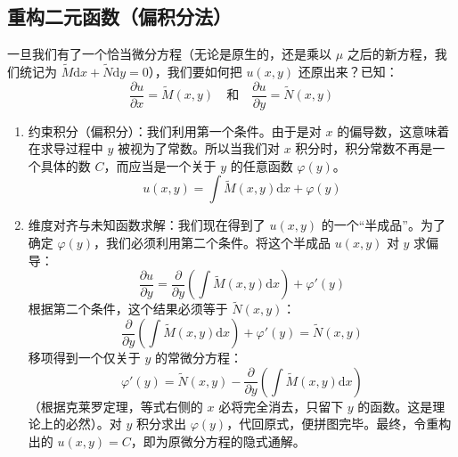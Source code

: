 \documentclass[lang=cn,11pt]{elegantbook}
\begin{document}
\subsection{重构二元函数（偏积分法）}

一旦我们有了一个恰当微分方程（无论是原生的，还是乘以 $\mu$ 之后的新方程，我们统记为 $\widetilde{M}\mathrm{d}x + \widetilde{N}\mathrm{d}y = 0$），我们要如何把 $u(x,y)$ 还原出来？已知：$$\frac{\partial u}{\partial x} = \widetilde{M}(x,y) \quad \text{和} \quad \frac{\partial u}{\partial y} = \widetilde{N}(x,y)$$

\begin{enumerate}
    \item 约束积分（偏积分）：我们利用第一个条件。由于是对 $x$ 的偏导数，这意味着在求导过程中 $y$ 被视为了常数。所以当我们对 $x$ 积分时，积分常数不再是一个具体的数 $C$，而应当是一个关于 $y$ 的任意函数 $\varphi(y)$。\[u(x,y) = \int \widetilde{M}(x,y)\mathrm{d}x + \varphi(y)\]
    \item 维度对齐与未知函数求解：我们现在得到了 $u(x,y)$ 的一个“半成品”。为了确定 $\varphi(y)$，我们必须利用第二个条件。将这个半成品 $u(x,y)$ 对 $y$ 求偏导：$$\frac{\partial u}{\partial y} = \frac{\partial}{\partial y}\left( \int \widetilde{M}(x,y)\mathrm{d}x \right) + \varphi'(y)$$根据第二个条件，这个结果必须等于 $\widetilde{N}(x,y)$：$$\frac{\partial}{\partial y}\left( \int \widetilde{M}(x,y)\mathrm{d}x \right) + \varphi'(y) = \widetilde{N}(x,y)$$移项得到一个仅关于 $y$ 的常微分方程：$$\varphi'(y) = \widetilde{N}(x,y) - \frac{\partial}{\partial y}\left( \int \widetilde{M}(x,y)\mathrm{d}x \right)$$（根据克莱罗定理，等式右侧的 $x$ 必将完全消去，只留下 $y$ 的函数。这是理论上的必然）。对 $y$ 积分求出 $\varphi(y)$，代回原式，便拼图完毕。最终，令重构出的 $u(x,y) = C$，即为原微分方程的隐式通解。
\end{enumerate}
\end{document}

